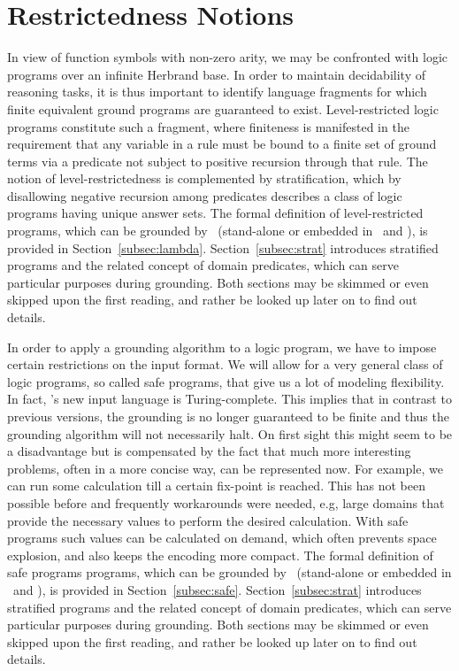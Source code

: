 \section{Restrictedness Notions}\label{sec:restricted}

\begin{oldstuff}
In view of function symbols with non-zero arity,
we may be confronted with logic programs over an infinite Herbrand base.
In order to maintain decidability of reasoning tasks,
it is thus important to identify language fragments for which
finite equivalent ground programs are guaranteed to exist.
Level-restricted logic programs constitute such a fragment,
where finiteness is manifested in the requirement that any variable in a rule
must be bound to a finite set of ground terms via a predicate not
subject to positive recursion through that rule.
The notion of level-restrictedness is complemented by stratification,
which by disallowing negative recursion among predicates describes a
class of logic programs having unique answer sets.
The formal definition of level-restricted programs,
which can be grounded by \gringo\ (stand-alone or embedded in \clingo\ and \iclingo),
is provided in Section~\ref{subsec:lambda}.
Section~\ref{subsec:strat} introduces stratified programs and the related
concept of domain predicates, which can serve particular purposes during grounding.
Both sections may be skimmed or even skipped upon the first reading,
and rather be looked up later on to find out details.
\end{oldstuff}

\begin{newstuff}
In order to apply a grounding algorithm to a logic program,
we have to impose certain restrictions on the input format.
We will allow for a very general class of logic programs,
so called safe programs,
that give us a lot of modeling flexibility.
In fact, 's new input language is Turing-complete.
This implies that in contrast to previous versions,
the grounding is no longer guaranteed to be finite
and thus the grounding algorithm will not necessarily halt.
On first sight this might seem to be a disadvantage but is compensated by the fact 
that much more interesting problems, often in a more concise way, can be represented now.
For example, we can run some calculation till a certain fix-point is reached.
This has not been possible before and frequently workarounds were needed, e.g, 
large domains that provide the necessary values to perform the desired calculation.
With safe programs such values can be calculated on demand,
which often prevents space explosion, and also keeps the encoding more compact.
The formal definition of safe programs programs,
which can be grounded by \gringo\ (stand-alone or embedded in \clingo\ and \iclingo),
is provided in Section~\ref{subsec:safe}.
Section~\ref{subsec:strat} introduces stratified programs and the related
concept of domain predicates, which can serve particular purposes during grounding.
Both sections may be skimmed or even skipped upon the first reading,
and rather be looked up later on to find out details.
\end{newstuff}


